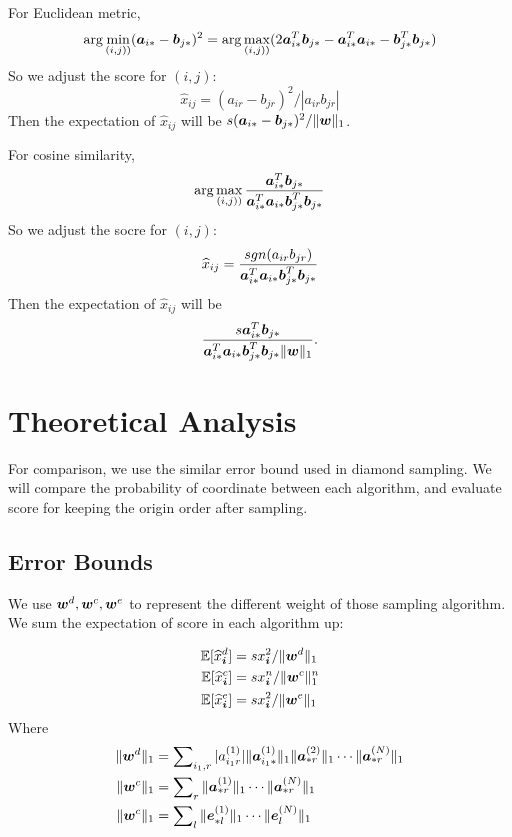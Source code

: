 \documentclass[letterpaper]{article}
\newcommand{\Sca}[3]{{#1}^{(#2)}_{i_#2#3}}%
\newcommand{\V}[1]{{\bm{{\MakeLowercase{#1}}}}}
\newcommand{\VnC}[3]{\V{#1}^{(#2)}_{#3}}
\newcommand{\Varow}[1]{\V{a}^{(#1)}_{i_#1*}}
\newcommand{\Vacol}[1]{\V{a}^{(#1)}_{*r}}
\newcommand{\norm}[2]{\|#1\|_{#2}}
\begin{document}
For Euclidean metric,
\[
\arg\min_{(i,j))}(\V{a}_{i*}-\V{b}_{j*})^2
= \arg\max_{(i,j))}(2\V{a}_{i*}^T\V{b}_{j*}
- \V{a}_{i*}^T\V{a}_{i*}
- \V{b}_{j*}^T\V{b}_{j*})
\]
So we adjust the score for $(i,j)$:
\[
\widehat{x}_{ij} = (a_{ir}-b_{jr})^2/|a_{ir}b_{jr}|
\]
Then the expectation of $\widehat{x}_{ij}$ will be $s(\V{a}_{i*}-\V{b}_{j*})^2/\norm{\V{w}}{1}$.

For cosine similarity,
\[
\arg\max_{(i,j))}\frac{\V{a}_{i*}^T\V{b}_{j*}}
{\V{a}_{i*}^T\V{a}_{i*}\V{b}_{j*}^T\V{b}_{j*}}
\]
So we adjust the socre for $(i,j)$:
\[
\widehat{x}_{ij} =\frac{sgn(a_{ir}b_{jr})}{\V{a}_{i*}^T\V{a}_{i*}\V{b}_{j*}^T\V{b}_{j*}}
\]
Then the expectation of $\widehat{x}_{ij}$ will be
\[
\frac{s\V{a}_{i*}^T\V{b}_{j*}}
{\V{a}_{i*}^T\V{a}_{i*}\V{b}_{j*}^T\V{b}_{j*}\norm{\V{w}}{1}}.
\]

\section{Theoretical Analysis}

For comparison, we use the similar error bound used in diamond sampling.
We will compare the probability of coordinate between each algorithm, and evaluate score for keeping the origin order after sampling.

\subsection{Error Bounds}
We use $\V{w}^d,\V{w}^c,\V{w}^e$ to represent the different weight of those sampling algorithm.
We sum the expectation of score in each algorithm up:

\begin{align}
    \mathbb{E}[\widehat{x}_{\V{i}}^d] &= sx^2_{\V{i}}/\norm{\V{W}^d}{1} \\
    \mathbb{E}[\widehat{x}_{\V{i}}^c] &= sx^n_{\V{i}}/\norm{\V{W}^c}{1}^n\\
    \mathbb{E}[\widehat{x}_{\V{i}}^e] &= sx_{\V{i}}^2/\norm{\V{w}^e}{1}
\end{align}
Where
\begin{align*}
    \norm{\V{W}^d}{1} &= \sum\nolimits_{i_1,r}
        |\Sca{a}{1}{r}|\norm{\Varow{1}}{1}\norm{\Vacol{2}}{1}\cdots\norm{\Vacol{N}}{1}\\
    \norm{\V{W}^c}{1} &= \sum\nolimits_{r}
        \norm{\Vacol{1}}{1}\cdots\norm{\Vacol{N}}{1}\\
    \norm{\V{W}^c}{1} &= \sum\nolimits_{l}
        \norm{\VnC{e}{1}{*l}}{1}\cdots\norm{\VnC{e}{N}{l}}{1}
\end{align*}
\end{document}
